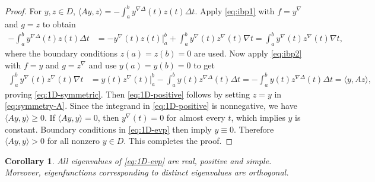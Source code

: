 \documentclass{article}
\newtheorem{corollary}[theorem]{Corollary}
\numberwithin{equation}{section}
\numberwithin{theorem}{section}
\begin{document}
\begin{proof}
For $y, z \in D$, $\langle Ay, z \rangle = -\displaystyle\int_a^b y^{\nabla\Delta}(t) z(t) \Delta t$. Apply \eqref{eq:ibp1} with $f = y^\nabla$ and $g = z$ to obtain
\begin{align*}
-\int_a^b y^{\nabla\Delta}(t) z(t) \Delta t &= -y^\nabla(t) z(t) \Big|_a^b + \int_a^b y^\nabla(t) z^\nabla(t) \nabla t= \int_a^b y^\nabla(t) z^\nabla(t) \nabla t,
\end{align*}
where the boundary conditions $z(a) = z(b) = 0$ are used.
Now apply \eqref{eq:ibp2} with $f = y$ and $g = z^\nabla$ and use $y(a) = y(b) = 0$ to get
\begin{align}
\label{eq:symmetry-A}
\int_a^b y^\nabla(t) z^\nabla(t) \nabla t &= y(t) z^\nabla(t) \Big|_a^b - \int_a^b y(t) z^{\nabla\Delta}(t) \Delta t = -\int_a^b y(t) z^{\nabla\Delta}(t) \Delta t = \langle y, Az \rangle,
\end{align}
proving \eqref{eq:1D-symmetric}.
Then \eqref{eq:1D-positive} follows by setting $z = y$ in \eqref{eq:symmetry-A}.
Since the integrand in \eqref{eq:1D-positive} is nonnegative, we have $\langle Ay, y \rangle \geq 0$. If $\langle Ay, y \rangle = 0$, then $y^\nabla(t) = 0$ for almost every $t$, which implies $y$ is constant. Boundary conditions in \eqref{eq:1D-evp} then imply $y \equiv 0$. Therefore $\langle Ay, y \rangle > 0$ for all nonzero $y \in D$. This completes the proof.
\end{proof}

\begin{corollary}\label{cor:eigenvalue-properties}
All eigenvalues of \eqref{eq:1D-evp} are real, positive and simple. Moreover, eigenfunctions corresponding to distinct eigenvalues are orthogonal.
\end{corollary}
\end{document}
